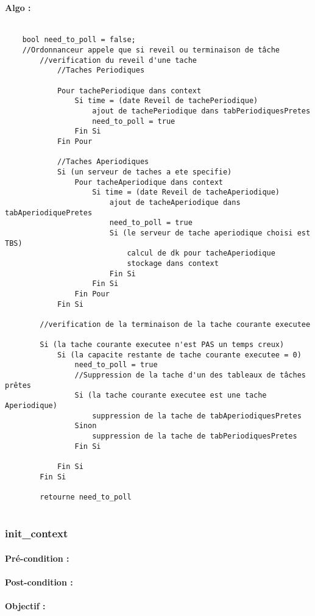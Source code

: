 				\paragraph{Algo :} 
					\begin{verbatim}
					
	bool need_to_poll = false;
	//Ordonnanceur appele que si reveil ou terminaison de tâche
		//verification du reveil d'une tache
			//Taches Periodiques
			
			Pour tachePeriodique dans context
				Si time = (date Reveil de tachePeriodique)
					ajout de tachePeriodique dans tabPeriodiquesPretes
					need_to_poll = true
				Fin Si
			Fin Pour
			
			//Taches Aperiodiques
			Si (un serveur de taches a ete specifie) 
				Pour tacheAperiodique dans context
					Si time = (date Reveil de tacheAperiodique)
						ajout de tacheAperiodique dans tabAperiodiquePretes
						need_to_poll = true
						Si (le serveur de tache aperiodique choisi est TBS)
							calcul de dk pour tacheAperiodique
							stockage dans context
						Fin Si
					Fin Si
				Fin Pour
			Fin Si
			
		//verification de la terminaison de la tache courante executee
		
		Si (la tache courante executee n'est PAS un temps creux)
			Si (la capacite restante de tache courante executee = 0)
				need_to_poll = true
				//Suppression de la tache d'un des tableaux de tâches prêtes
				Si (la tache courante executee est une tache Aperiodique)
					suppression de la tache de tabAperiodiquesPretes
				Sinon
					suppression de la tache de tabPeriodiquesPretes
				Fin Si
		
			Fin Si
		Fin Si
		
		retourne need_to_poll
				
					\end{verbatim}
				
			\subsubsection{init\_context}
				\paragraph{Pré-condition :} 
				\paragraph{Post-condition :} 
				\paragraph{Objectif :} 
